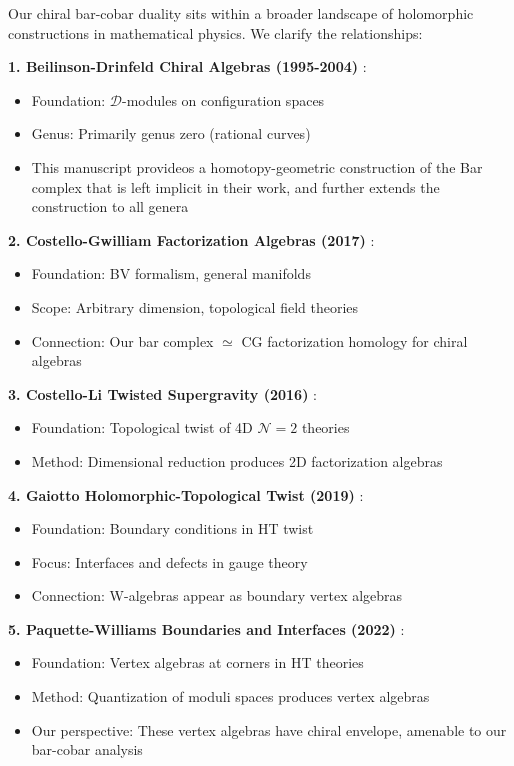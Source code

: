 \begin{remark}\label{rem:holomorphic-landscape}
Our chiral bar-cobar duality sits within a broader landscape of holomorphic 
constructions in mathematical physics. We clarify the relationships:

\textbf{1. Beilinson-Drinfeld Chiral Algebras (1995-2004)} \cite{BD04}:
\begin{itemize}
\item Foundation: $\mathcal{D}$-modules on configuration spaces
\item Genus: Primarily genus zero (rational curves)
\item This manuscript provideos a homotopy-geometric construction of the Bar complex that is left implicit in their work, and further extends the construction to all genera
\end{itemize}

\textbf{2. Costello-Gwilliam Factorization Algebras (2017)} \cite{CG17}:
\begin{itemize}
\item Foundation: BV formalism, general manifolds
\item Scope: Arbitrary dimension, topological field theories
\item Connection: Our bar complex $\simeq$ CG factorization homology for chiral algebras
\end{itemize}

\textbf{3. Costello-Li Twisted Supergravity (2016)} \cite{CL16}:
\begin{itemize}
\item Foundation: Topological twist of 4D $\mathcal{N}=2$ theories
\item Method: Dimensional reduction produces 2D factorization algebras
\end{itemize}

\textbf{4. Gaiotto Holomorphic-Topological Twist (2019)} \cite{Gai19}:
\begin{itemize}
\item Foundation: Boundary conditions in HT twist
\item Focus: Interfaces and defects in gauge theory
\item Connection: W-algebras appear as boundary vertex algebras
\end{itemize}

\textbf{5. Paquette-Williams Boundaries and Interfaces (2022)} \cite{PW22}:
\begin{itemize}
\item Foundation: Vertex algebras at corners in HT theories
\item Method: Quantization of moduli spaces produces vertex algebras
\item Our perspective: These vertex algebras have chiral envelope, 
      amenable to our bar-cobar analysis
\end{itemize}


\end{remark}

